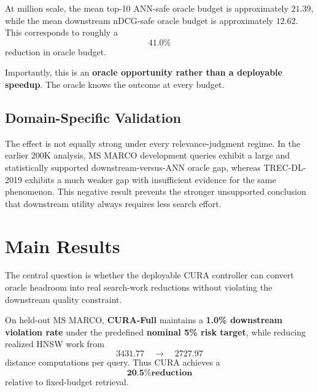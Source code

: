\documentclass[10pt,twocolumn]{article}
\newcommand{\cura}{CURA}
\begin{document}
At million scale, the mean top-10 ANN-safe oracle budget is approximately $21.39$, while the mean downstream nDCG-safe oracle budget is approximately $12.62$. This corresponds to roughly a
\[
\boxed{41.0\%}
\]
reduction in oracle budget.

Importantly, this is an \textbf{oracle opportunity rather than a deployable speedup}. The oracle knows the outcome at every budget.

\subsection{Domain-Specific Validation}
The effect is not equally strong under every relevance-judgment regime. In the earlier 200K analysis, MS MARCO development queries exhibit a large and statistically supported downstream-versus-ANN oracle gap, whereas TREC-DL-2019 exhibits a much weaker gap with insufficient evidence for the same phenomenon. This negative result prevents the stronger unsupported conclusion that downstream utility always requires less search effort.

\section{Main Results}
\label{sec:results}
The central question is whether the deployable \cura{} controller can convert oracle headroom into real search-work reductions without violating the downstream quality constraint.

\begin{tcolorbox}[colback=CuraLight,colframe=CuraGreen,title=\textbf{Primary Held-Out Result},fonttitle=\small,coltitle=CuraDark,boxrule=0.9pt,arc=3pt,left=5pt,right=5pt,top=4pt,bottom=4pt]
\small
On held-out MS MARCO, \textbf{\cura{}-Full} maintains a \textbf{1.0\% downstream violation rate} under the predefined \textbf{nominal 5\% risk target}, while reducing realized HNSW work from
\[
3431.77\quad\longrightarrow\quad2727.97
\]
distance computations per query. Thus \cura{} achieves a
\[
\boxed{\textbf{20.5\% reduction}}
\]
relative to fixed-budget retrieval.
\end{tcolorbox}
\end{document}
